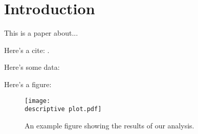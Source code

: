 \section{Introduction}

This is a paper about...

Here's a cite: \citet{Anderson1992}.

Here's some data:


Here's a figure:
\begin{figure}[htbp]
    \centering
    \texttt{[image: \\descriptive plot.pdf]}
    \caption{An example figure showing the results of our analysis.}
    \label{fig:example_figure}
\end{figure}